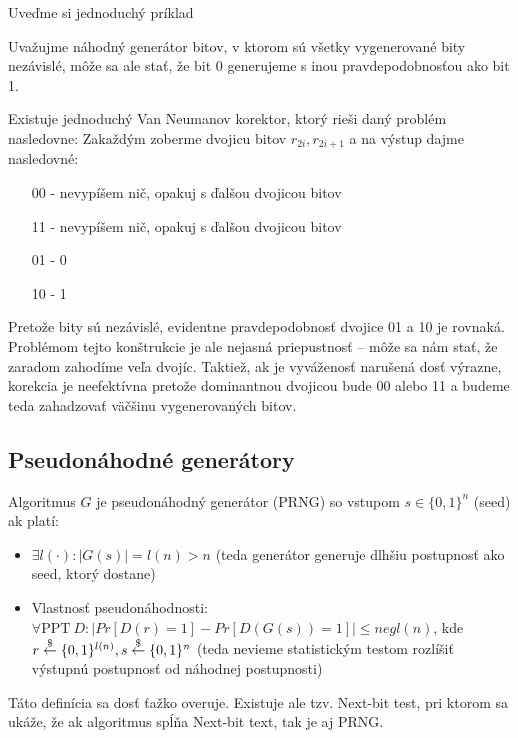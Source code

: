 Uveďme si jednoduchý príklad
\begin{priklad}
  Uvažujme náhodný generátor bitov, v ktorom sú všetky vygenerované bity
  nezávislé, môže sa ale stať, že bit 0 generujeme s inou pravdepodobnosťou
  ako bit 1.

  Existuje jednoduchý Van Neumanov korektor, ktorý rieši
  daný problém nasledovne: Zakaždým zoberme dvojicu bitov $r_{2i},r_{2i+1}$
  a na výstup dajme nasledovné:
  \begin{itemize}
    \item[00] - nevypíšem nič, opakuj s ďalšou dvojicou bitov
    \item[11] - nevypíšem nič, opakuj s ďalšou dvojicou bitov
    \item[01] - 0
    \item[10] - 1
  \end{itemize}
  Pretože bity sú nezávislé, evidentne pravdepodobnosť dvojice 01 a 10 je
  rovnaká. Problémom tejto konštrukcie je ale nejasná priepustnosť --
  môže sa nám stať, že zaradom zahodíme veľa dvojíc. Taktiež, ak je
  vyváženosť narušená dosť výrazne, korekcia je neefektívna pretože
  dominantnou dvojicou bude 00 alebo 11 a budeme teda zahadzovať väčšinu
  vygenerovaných bitov.
\end{priklad}

\subsection{Pseudonáhodné generátory}

\begin{definicia}
Algoritmus $G$ je pseudonáhodný generátor (PRNG) so vstupom $s \in \{0,1\}^n$ (seed) ak platí:
\begin{itemize}
\item $\exists l(\cdot)\colon |G(s)| = l(n) > n$ (teda generátor generuje dlhšiu postupnosť ako seed, ktorý dostane)
\item Vlastnosť pseudonáhodnosti: $\forall \text{PPT}~ D\colon |Pr[D(r) = 1] - Pr[D(G(s)) = 1]| \leq negl(n)$, kde 
$r \overset{\$}{\leftarrow} \{0,1\}^{l(n)}, s \overset{\$}{\leftarrow} \{0,1\}^n$ (teda nevieme statistickým testom rozlíšiť výstupnú postupnosť od náhodnej postupnosti)
\end{itemize}
\end{definicia}

Táto definícia sa dosť ťažko overuje. Existuje ale tzv. Next-bit test, pri ktorom sa ukáže, že ak algoritmus
spĺňa Next-bit text, tak je aj PRNG.

